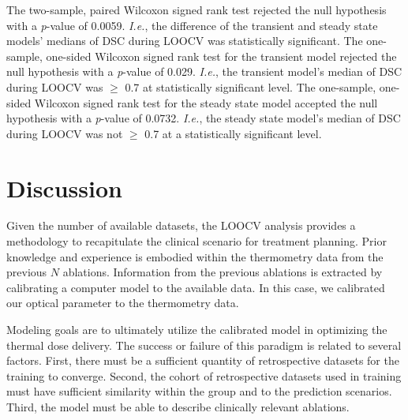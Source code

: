 \documentclass[12pt]{article}
\begin{document}
The two-sample, paired Wilcoxon signed rank test rejected the null hypothesis
with a \textit{p}-value of 0.0059.
\textit{I.e.}, the difference of the transient and steady state models' medians of DSC
during LOOCV was statistically significant.
The one-sample, one-sided Wilcoxon signed rank test for the transient model
rejected the null hypothesis with a \textit{p}-value of 0.029.
\textit{I.e.}, the transient model's median of DSC during LOOCV was $\geq$
0.7 at statistically significant level.
The one-sample, one-sided Wilcoxon signed rank test for the steady state model
accepted the null hypothesis with a \textit{p}-value of 0.0732.
\textit{I.e.}, the steady state model's median of DSC during LOOCV was
not $\geq$ 0.7 at a statistically significant level.



\section{Discussion}

Given the number of available datasets, the LOOCV analysis
provides a methodology to recapitulate the clinical scenario
for treatment planning. Prior knowledge and experience is embodied
within the thermometry data from the previous $N$ ablations.
Information from the previous ablations is extracted by calibrating
a computer model to the available data. 
In this case, we calibrated our optical parameter to the thermometry data.
{\color{red}
Modeling goals are to ultimately utilize the calibrated model in optimizing
the thermal dose delivery.
The success
or failure of this paradigm is related to several factors.
First, there must be a sufficient quantity of retrospective datasets
for the training to converge. Second, the cohort of retrospective
datasets used in training must have sufficient similarity within the group
and to the prediction scenarios. Third, the model must be able 
to describe clinically relevant ablations. 

}
\end{document}
